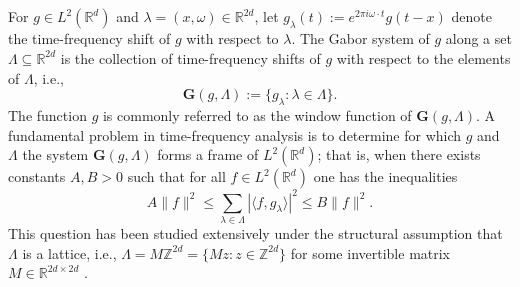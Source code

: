 \documentclass[reqno,a4paper,12pt]{amsart}
\numberwithin{equation}{section}
\def\Z{{\mathbb Z}}
\def\R{{\mathbb R}}
\newcommand{\Rd}{{\R^d}}
\newcommand\1{\mathds{1}}
\begin{document}
\subsection{}
For $g \in L^2(\mathbb{R}^d)$ and $\lambda=(x,\omega)\in\R^{2d}$, let $g_\lambda(t) := e^{2\pi i \omega\cdot t}g(t-x)$ denote the time-frequency shift of $g$ with respect to $\lambda$. The Gabor system of $g$ along a set $\Lambda \subseteq \R^{2d}$ is the collection of time-frequency shifts of $g$ with respect to the elements of $\Lambda$, i.e., 
$$
\mathbf{G}(g,\Lambda):=\{g_\lambda:\lambda\in\Lambda\}.
$$
The function $g$ is commonly referred to as the window function of $\mathbf{G}(g,\Lambda)$.
A fundamental problem in time-frequency analysis is to determine for which $g$ and $\Lambda$ the system $\mathbf{G}(g,\Lambda)$ forms a frame of $L^2(\mathbb{R}^d)$; that is, when there exists constants $A,B>0$ such that for all $f \in L^2(\Rd)$ one has the inequalities
$$
A\|f\|^2 \leq \sum_{\lambda\in\Lambda} |\langle f,g_\lambda\rangle|^2 \leq B\|f\|^2.
$$
This question has been studied extensively under the structural assumption that $\Lambda$ is a lattice, i.e., $\Lambda=M\mathbb{Z}^{2d} = \{ Mz : z \in \Z^{2d} \}$
for some invertible matrix $M\in\mathbb{R}^{2d\times 2d}$ \cite{Groechenig, belov2023gabor,grochenig2023totally,GroechenigRomeroStoeckler,1111}.
\end{document}
